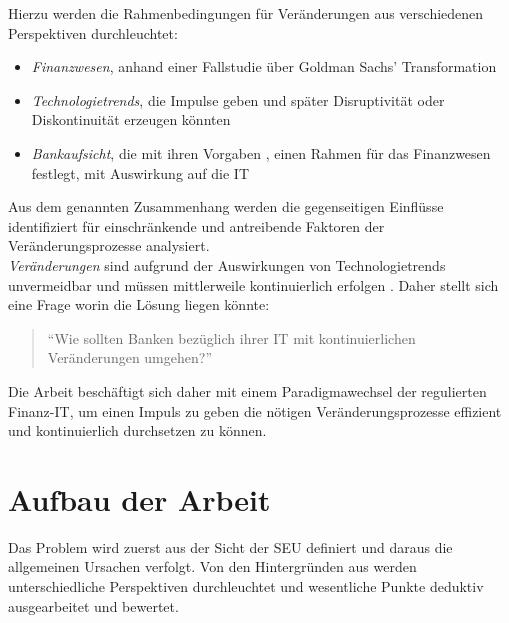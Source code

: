 Hierzu werden die Rahmenbedingungen für Veränderungen aus verschiedenen Perspektiven durchleuchtet:
\begin{itemize}
    \item \emph{Finanzwesen}, anhand einer Fallstudie \cite{Gupta:2017} über Goldman Sachs' Transformation
    \item \emph{Technologietrends}, die Impulse geben und später Disruptivität oder Diskontinuität \cite{Fernandez:2020} erzeugen könnten
    \item \emph{Bankaufsicht}, die mit ihren Vorgaben \cite{MaRisk:2017}, \cite{BAIT:2018} einen Rahmen für das Finanzwesen festlegt, mit Auswirkung auf die IT
\end{itemize}
Aus dem genannten Zusammenhang werden die gegenseitigen Einflüsse identifiziert für einschränkende und antreibende Faktoren der Veränderungsprozesse analysiert. 
\medskip
\\
\emph{Veränderungen} sind aufgrund der Auswirkungen von Technologietrends unvermeidbar und müssen mittlerweile kontinuierlich erfolgen \cite{Bussmann2006, Alt2017, Fernandez:2020}. Daher stellt sich eine Frage worin die Lösung liegen könnte: 
\begin{quote}
    \enquote{Wie sollten Banken bezüglich ihrer IT mit kontinuierlichen Veränderungen umgehen?}
\end{quote}
Die Arbeit beschäftigt sich daher mit einem Paradigmawechsel der regulierten Finanz-IT, um einen Impuls zu geben die nötigen Veränderungsprozesse effizient und kontinuierlich durchsetzen zu können.


%
%
\section{Aufbau der Arbeit}
\label{sec:intro:structure}
Das Problem wird zuerst aus der Sicht der \ac{SEU} definiert und daraus die allgemeinen Ursachen verfolgt. Von den Hintergründen aus werden unterschiedliche Perspektiven durchleuchtet und wesentliche Punkte deduktiv ausgearbeitet und bewertet.

